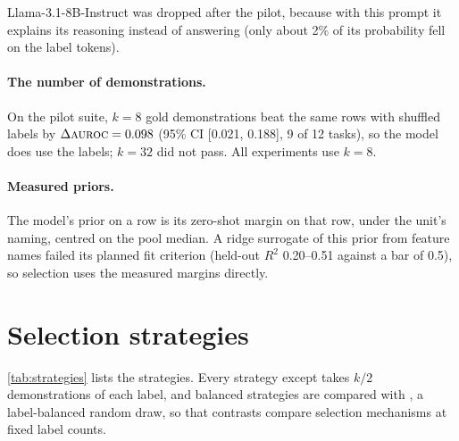 Llama-3.1-8B-Instruct \citep{grattafiori2024llama3} was dropped after the pilot, because with this prompt it explains its reasoning instead of answering (only about 2\% of its probability fell on the label tokens).

\paragraph{The number of demonstrations.}
On the pilot suite, $k = 8$ gold demonstrations beat the same rows with shuffled labels by $\Delta\textsc{auroc} = 0.098$ (95\% CI [0.021, 0.188], 9 of 12 tasks), so the model does use the labels; $k = 32$ did not pass.
All experiments use $k = 8$.

\paragraph{Measured priors.}
The model's prior on a row is its zero-shot margin on that row, under the unit's naming, centred on the pool median.
A ridge surrogate of this prior from feature names \citep{hoerl1970ridge} failed its planned fit criterion (held-out $R^2$ 0.20--0.51 against a bar of 0.5), so selection uses the measured margins directly.

\section{Selection strategies}
\label{sec:strategies}

\autoref{tab:strategies} lists the strategies.
Every strategy except  takes $k/2$ demonstrations of each label, and balanced strategies are compared with , a label-balanced random draw, so that contrasts compare selection mechanisms at fixed label counts.

